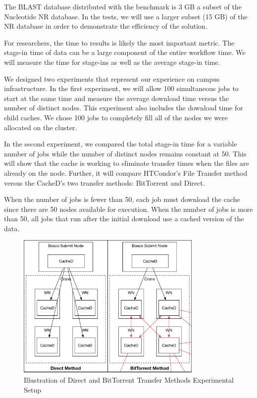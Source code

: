 The BLAST database distributed with the benchmark is 3 GB a subset of the Nucleotide NR database.  In the tests, we will use a larger subset (15 GB) of the NR database in order to demonstrate the efficiency of the solution.

For researchers, the time to results is likely the most important metric.  The stage-in time of data can be a large component of the entire workflow time.  We will measure the time for stage-ins as well as the average stage-in time.

We designed two experiments that represent our experience on campus infrastructure.  In the first experiment, we will allow 100 simultaneous jobs to start at the same time and measure the average download time versus the number of distinct nodes.  This experiment also includes the download time for child caches.  We chose 100 jobs to completely fill all of the nodes we were allocated on the cluster.  

In the second experiment, we compared the total stage-in time for a variable number of jobs while the number of distinct nodes remains constant at 50.  This will show that the cache is working to eliminate transfer times when the files are already on the node.  Further, it will compare HTCondor's File Transfer method versus the CacheD's two transfer methods: BitTorrent and Direct.

When the number of jobs is fewer than 50, each job must download the cache since there are 50 nodes available for execution.  When the number of jobs is more than 50, all jobs that run after the initial download use a cached version of the data.

\begin{figure}[h!t]
	\centering
	\includegraphics[width=0.8\textwidth]{images/CachedTransferMethods.pdf}
	\caption{Illustration of Direct and BitTorrent Transfer Methods Experimental Setup}
	\label{fig:cachedexperimentalsetup}
\end{figure}


